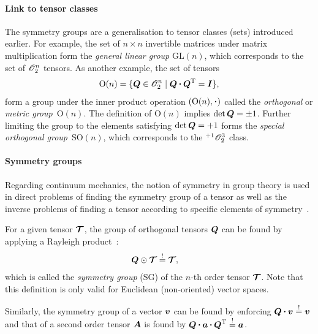 	\paragraph{Link to tensor classes} The symmetry groups are a generalisation to tensor classes (sets) introduced earlier. For example, the set of $n\times n$ invertible matrices under matrix multiplication form the \textit{general linear group} $\text{GL}(n)$, which corresponds to the set of $\mathscr{O}_{2}^{n}$ tensors. As another example, the set of tensors
	\begin{alignat}{3}
	\text{O}(n)=\{\tenb{Q}\in\class{2}{n}\;|\; \tenb{Q}\scp\tenb{Q}^\tran=\unitb \}, 
	\end{alignat}
	form a group under the inner product operation $(\text{O}(n),\scp)$ called the \textit{orthogonal} or \textit{metric group}~$\text{O}(n)$. The definition of $\text{O}(n)$ implies $\det{\tenb{Q}}=\pm 1$. Further limiting the group to the elements satisfying $\det{\tenb{Q}}=+1$ forms the \textit{special orthogonal group}~$\text{SO}(n)$, which corresponds to the $\unisetp$ class. 

	\paragraph{Symmetry groups} Regarding continuum mechanics, the notion of symmetry in group theory is used in direct problems of finding the symmetry group of a tensor as well as the inverse problems of finding a tensor according to specific elements of symmetry~\autocite{Zhilin.2006}.
	\begin{definition}
	For a given tensor $\mathord{\mbox{\boldmath$\mathcal{T}$}}$, the group of orthogonal tensors $\tenb{Q}$ can be found by applying a Rayleigh product~\parencite{Bohlke.2001}:
	\begin{alignat}{3}\label{eq:sym_group}
	&\tenb{Q} \Rayleigh \ten{T} \equimust\ten{T},
	\end{alignat}
	which is called the \textit{symmetry group} (SG) of the $n$-th order tensor $\mathord{\mbox{\boldmath$\mathcal{T}$}}$. Note that this definition is only valid for Euclidean (non-oriented) vector spaces.
	\end{definition}
	Similarly, the symmetry group of a vector $\tena{v}$ can be found by enforcing $\tenb{Q} \scp \tena{v}\equimust\tena{v}$ and that of a second order tensor $\tenb{A}$ is found by $\tenb{Q} \scp \tena{A} \scp \tenb{Q}^\tran\equimust\tena{A}$.


